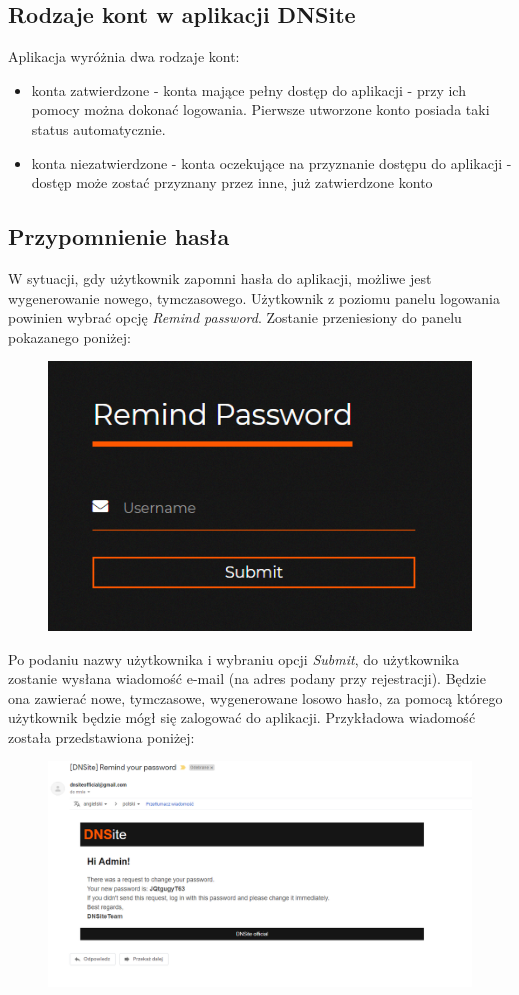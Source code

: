 \documentclass[12pt] {article}
\begin{document}
\subsection{Rodzaje kont w aplikacji DNSite}
Aplikacja wyróżnia dwa rodzaje kont:
\begin{itemize}
\item konta zatwierdzone - konta mające pełny dostęp do aplikacji - przy ich pomocy można dokonać logowania. Pierwsze utworzone konto posiada taki status automatycznie.
\item konta niezatwierdzone - konta oczekujące na przyznanie dostępu do aplikacji - dostęp może zostać przyznany przez inne, już zatwierdzone konto
\end{itemize}


\subsection{Przypomnienie hasła}
W sytuacji, gdy użytkownik zapomni hasła do aplikacji, możliwe jest wygenerowanie nowego, tymczasowego. Użytkownik z poziomu panelu logowania powinien wybrać opcję \emph{Remind password}. Zostanie przeniesiony do panelu pokazanego poniżej:
\begin{figure}[H]
\centering
\includegraphics[scale = 1]{res/6_nowe_haslo}
\end{figure}
Po podaniu nazwy użytkownika i wybraniu opcji \emph{Submit}, do użytkownika zostanie wysłana wiadomość e-mail (na adres podany przy rejestracji). Będzie ona zawierać nowe, tymczasowe, wygenerowane losowo hasło, za pomocą którego użytkownik będzie mógł się zalogować do aplikacji. Przykładowa wiadomość została przedstawiona poniżej:
\begin{figure}[H]
\centering
\includegraphics[width=\textwidth]{res/7_mail_haslo}
\end{figure}
\end{document}
